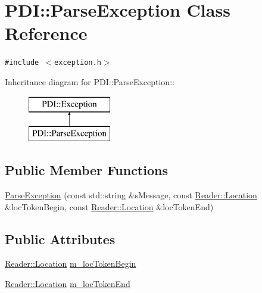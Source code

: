 \hypertarget{class_p_d_i_1_1_parse_exception}{
\section{PDI::ParseException Class Reference}
\label{class_p_d_i_1_1_parse_exception}
}
{\tt \#include $<$exception.h$>$}

Inheritance diagram for PDI::ParseException::\begin{figure}[H]
\begin{center}
\leavevmode
\includegraphics[height=2cm]{class_p_d_i_1_1_parse_exception}
\end{center}
\end{figure}
\subsection*{Public Member Functions}
\begin{CompactItemize}
\item 
\hyperlink{class_p_d_i_1_1_parse_exception_07a07ade97ed40b0d04be7ee03d687a2}{ParseException} (const std::string \&sMessage, const \hyperlink{struct_p_d_i_1_1_reader_1_1_location}{Reader::Location} \&locTokenBegin, const \hyperlink{struct_p_d_i_1_1_reader_1_1_location}{Reader::Location} \&locTokenEnd)
\end{CompactItemize}
\subsection*{Public Attributes}
\begin{CompactItemize}
\item 
\hyperlink{struct_p_d_i_1_1_reader_1_1_location}{Reader::Location} \hyperlink{class_p_d_i_1_1_parse_exception_0330cdecfe72277cc69f878a20cd76ef}{m\_\-locTokenBegin}
\item 
\hyperlink{struct_p_d_i_1_1_reader_1_1_location}{Reader::Location} \hyperlink{class_p_d_i_1_1_parse_exception_8cf4c86a198fff7f3115e7c97f1a6c18}{m\_\-locTokenEnd}
\end{CompactItemize}


